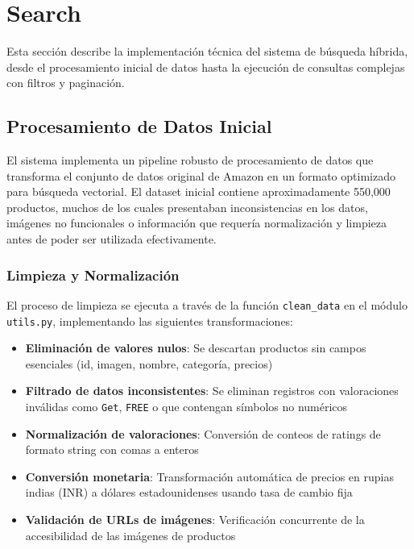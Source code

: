 \section{Search}

Esta sección describe la implementación técnica del sistema de búsqueda híbrida, desde el procesamiento inicial de datos hasta la ejecución de consultas complejas con filtros y paginación.

\subsection{Procesamiento de Datos Inicial}

El sistema implementa un pipeline robusto de procesamiento de datos que transforma el conjunto de datos original de Amazon en un formato optimizado para búsqueda vectorial. El dataset inicial contiene aproximadamente 550,000 productos, muchos de los cuales presentaban inconsistencias en los datos, imágenes no funcionales o información que requería normalización y limpieza antes de poder ser utilizada efectivamente.

\subsubsection{Limpieza y Normalización}

El proceso de limpieza se ejecuta a través de la función \texttt{clean\_data} en el módulo \texttt{utils.py}, implementando las siguientes transformaciones:

\begin{itemize}
    \item \textbf{Eliminación de valores nulos}: Se descartan productos sin campos esenciales (id, imagen, nombre, categoría, precios)
    \item \textbf{Filtrado de datos inconsistentes}: Se eliminan registros con valoraciones inválidas como \texttt{Get}, \texttt{FREE} o que contengan símbolos no numéricos
    \item \textbf{Normalización de valoraciones}: Conversión de conteos de ratings de formato string con comas a enteros
    \item \textbf{Conversión monetaria}: Transformación automática de precios en rupias indias (INR) a dólares estadounidenses usando tasa de cambio fija
    \item \textbf{Validación de URLs de imágenes}: Verificación concurrente de la accesibilidad de las imágenes de productos
\end{itemize}

